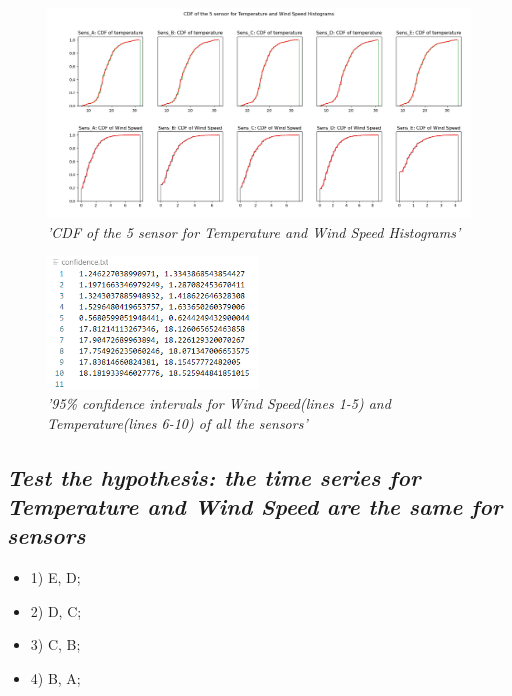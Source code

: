 \documentclass[a4paper,12pt]{article} %
\begin{document}
\begin{figure}[H]
\centering
\includegraphics[width=\textwidth]{Graphs/CDF_of_the_5_sensor_-_Temperature,_Wind_Speed.png}
\caption{\it'CDF of the 5 sensor for Temperature and Wind Speed Histograms'}
\end{figure}



\begin{figure}[H]
    \centering
    \includegraphics[width=0.5\textwidth]{Graphs/Confidence_95perc_Temp_WS.PNG}
    \caption{\it'95\% confidence intervals for Wind Speed(lines 1-5) and Temperature(lines 6-10) of all the sensors'}
    \end{figure}




\subsection{\it Test the hypothesis: the time series for Temperature and Wind Speed are the same for sensors}




\begin{itemize}
\item {1) E, D;}
\item {2) D, C;}
\item {3) C, B;}
\item {4) B, A;}
\end{itemize}
\end{document}
